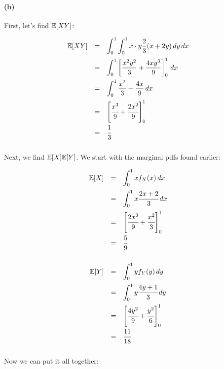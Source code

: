\documentclass[a4paper]{article}
\begin{document}
\paragraph{(b)}

First, let's find $\mathbb{E}[XY]$:

\begin{equation}
\begin{array}{rll}
\mathbb{E}[XY] & = & \displaystyle\int^1_{0} \int^1_{0} x \cdot y \frac{2}{3}(x+2y) \,dy  \,dx \\[.15in]
& = & \displaystyle\int^1_{0} \left[ \frac{x^2 y^2}{3} + \frac{4x y^3}{9} \right]^1_0 \,dx \\[.15in]
& = & \displaystyle\int^1_{0} \frac{x^2}{3} + \frac{4x}{9} \,dx \\[.15in]
& = & \left[ \cfrac{x^3}{9} + \cfrac{2x^2}{9} \right]^1_0 \\[.15in]
& = & \cfrac{1}{3} \\[.15in]
\end{array}
\end{equation}

Next, we find $\mathbb{E}[X]\mathbb{E}[Y]$. We start with the marginal pdfs found earlier:

\begin{equation}
\begin{array}{rll}
\mathbb{E}[X] & = & \displaystyle\int^1_{0} x f_X(x) \,dx \\[.15in]
& = & \displaystyle\int^1_{0} x \cfrac{2x+2}{3} \,dx \\[.15in]
& = & \left[ \cfrac{2x^3}{9} + \cfrac{x^2}{3} \right]^1_0 \\[.15in]
& = & \cfrac{5}{9} \\[.15in]
\end{array}
\end{equation}

\begin{equation}
\begin{array}{rll}
\mathbb{E}[Y] & = & \displaystyle\int^1_{0} y f_Y(y) \,dy \\[.15in]
& = & \displaystyle\int^1_{0} y \cfrac{4y+1}{3} \,dy \\[.15in]
& = & \left[ \cfrac{4y^2}{9} + \cfrac{y^2}{6} \right]^1_0 \\[.15in]
& = & \cfrac{11}{18} \\[.15in]
\end{array}
\end{equation}

Now we can put it all together:
\end{document}
